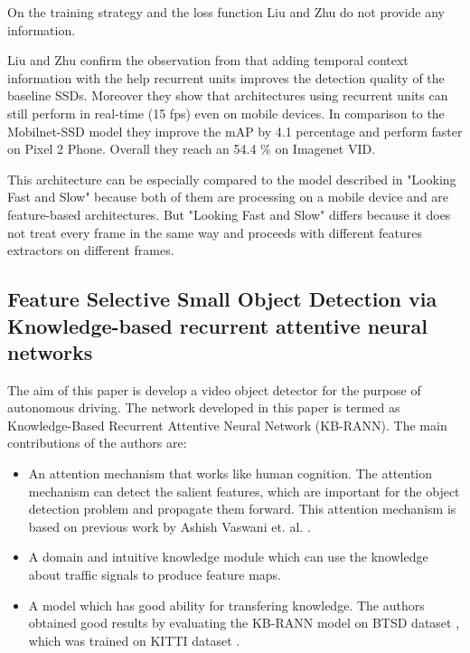 \documentclass[conference]{IEEEtran}
\begin{document}
On the training strategy and the loss function Liu and Zhu do not provide any information. \newline

Liu and Zhu confirm the observation from \cite{b1} that adding temporal context information with the help recurrent units improves the detection quality of the baseline SSDs. Moreover they show that architectures using recurrent units can still perform in real-time (15 fps) even on mobile devices. In comparison to the Mobilnet-SSD model they improve the mAP by 4.1 percentage and perform faster on Pixel 2 Phone. Overall they reach an 54.4 \% on Imagenet VID. \newline

This architecture can be especially compared to the model described in "Looking Fast and Slow" because both of them are processing on a mobile device and are feature-based architectures. But "Looking Fast and Slow" differs because it does not treat every frame in the same way and proceeds with different features extractors on different frames. 

\subsection{Feature Selective Small Object Detection via Knowledge-based recurrent attentive neural networks \cite{b6}}

The aim of this paper is develop a video object detector for the purpose of autonomous driving. The network developed in this paper is termed as Knowledge-Based Recurrent Attentive Neural Network (KB-RANN). \newline
The main contributions of the authors are:
\begin{itemize}
  \item An attention mechanism that works like human cognition. The attention mechanism can detect the salient features, which are important for the object detection problem and propagate them forward. This attention mechanism is based on previous work by Ashish Vaswani et. al. \cite{b30}. 
  \item A domain and intuitive knowledge module which can use the knowledge about traffic signals to produce feature maps.
  \item A model which has good ability for transfering knowledge. The authors obtained good results by evaluating the KB-RANN model on BTSD dataset \cite{b29}, which was trained on KITTI dataset \cite{b21}.
\end{itemize}
\end{document}
